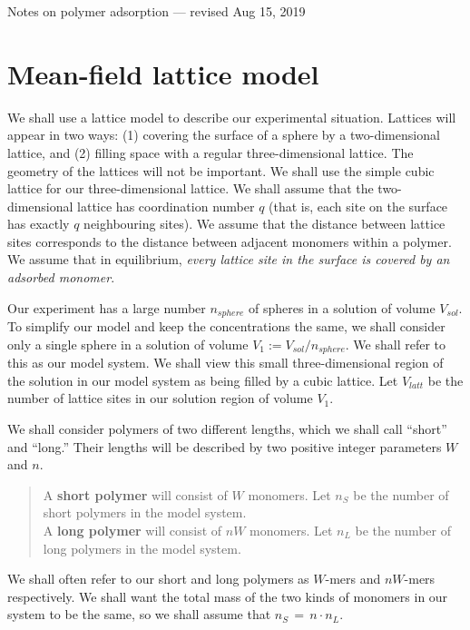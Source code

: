 \documentclass[12pt]{article}
\begin{document}
\begin{center}
Notes on polymer adsorption --- revised Aug 15, 2019
\end{center}

\section{Mean-field lattice model}

We shall use a lattice model to describe our experimental situation.  
Lattices will appear in two ways:  (1) covering the surface of a sphere by a two-dimensional lattice, and
(2) filling space with a regular three-dimensional lattice.  
The geometry of the lattices will not be important.  We shall use the simple cubic lattice for our
three-dimensional lattice.  
We shall assume that the two-dimensional lattice has coordination number $q$ 
(that is, each site on the surface has exactly $q$ neighbouring sites).  We assume that 
the distance between lattice sites corresponds to the distance between adjacent monomers within a 
polymer.  We assume that in equilibrium, \textit{every lattice site in the surface is covered by an adsorbed 
monomer}.

Our experiment has a large number $n_{sphere}$ of spheres in a solution of volume $V_{sol}$.  To simplify 
our model and keep the concentrations the same, we shall consider only a single sphere in a solution
of volume $V_1:=V_{sol}/n_{sphere}$.  We shall refer to this as our model system.
We shall view this small three-dimensional region of the solution in our model system as being filled by a 
cubic lattice.
Let $V_{latt}$ be the number of lattice sites in our solution region of volume $V_1$. 

We shall consider polymers of two different lengths, which we shall call ``short'' and ``long.''  Their lengths
will be described by two positive integer parameters $W$ and $n$.

\begin{verse}
A \textbf{short polymer} will consist of $W$ monomers.  
Let $n_S$ be the number of short polymers in the model system. 
\\
A \textbf{long polymer} will consist of $nW$ monomers.  
Let $n_L$ be the number of long polymers in the model system. 
\end{verse}
We shall often refer to our short and long polymers as $W$-mers and $nW$-mers respectively.
We shall want the total mass of the two kinds of monomers in our system to be the same, so we 
shall assume that $n_S \,=\, n\cdot n_L$.
\end{document}
